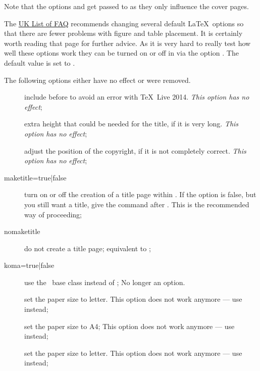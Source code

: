 Note that the options  and  get passed to 
as they only influence the cover pages.

The
\href{http://www.tex.ac.uk/cgi-bin/texfaq2html?label=floats}{UK List of FAQ}
recommends changing several default \LaTeX\ options so that there are fewer problems
with figure and table placement.
It is certainly worth reading that page for further advice.
As it is very hard to really test how well these options work
they can be turned on or off in  via the option .
The default value is set to .

The following options either have no effect or were removed.
\begin{description}
\item[] include  before  to avoid
  an error with \TeX\ Live 2014.
  \emph{ This option has no effect};
\item[] extra height that could be needed for the title, if it is very long.
  \emph{ This option has no effect};
\item[] adjust the position of the copyright, if it is not completely correct.
  \emph{ This option has no effect};
\item[maketitle={\normalfont true}|false] turn on or off the creation of a title page within .
   If the option is false, but you still want a title, give the command  after
  \verb||.
  This is the recommended way of proceeding;
\item[nomaketitle]\mbox{}
    do not create a title page; equivalent to ;
\item[koma=true|{\normalfont false}] use the \KOMAScript\ base class  instead of ;
   No longer an option.
\item[] set the paper size to letter.
   This option does not work anymore
  --- use  instead;
\item[] set the paper size to A4;
   This option does not work anymore
  --- use  instead;
\item[] set the paper size to letter.
   This option does not work anymore
  --- use  instead;
\end{description}

